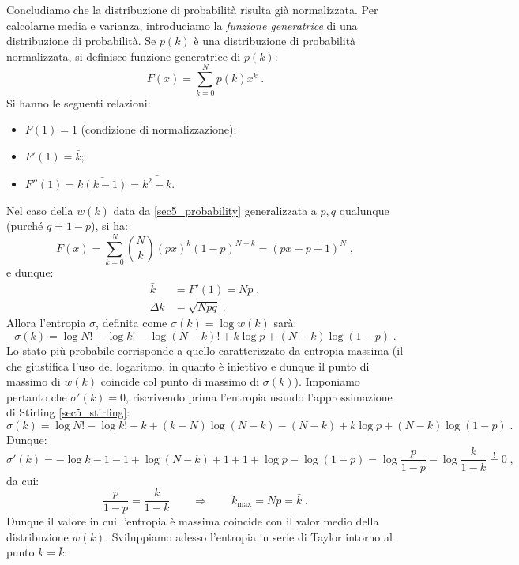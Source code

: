 Concludiamo che la distribuzione di probabilità risulta già normalizzata. Per calcolarne media e varianza, introduciamo la \textit{funzione generatrice} di una distribuzione di probabilità. Se $p(k)$ è una distribuzione di probabilità normalizzata, si definisce funzione generatrice di $p(k)$:
\begin{equation}
F(x)=\sum_{k=0}^N p(k)x^k\;.
\end{equation}
Si hanno le seguenti relazioni:
\begin{itemize}
 \item $F(1)=1$ (condizione di normalizzazione);
 \item $F'(1)=\bar{k}$;
 \item $F''(1)=\bar{k(k-1)}=\bar{k^2-k}$.
\end{itemize}
Nel caso della $w(k)$ data da \eqref{sec5_probability} generalizzata a $p,q$ qualunque (purché $q=1-p$), si ha:
\begin{equation}
F(x)=\sum_{k=0}^N \binom{N}{k}(px)^k(1-p)^{N-k}=(px-p+1)^N\;,
\end{equation}
e dunque:
\begin{align}
\bar{k}&=F'(1)=Np\;, \\
\Delta k &= \sqrt{Npq}\;.
\end{align}
Allora l'entropia $\sigma$, definita come $\sigma(k)=\log w(k)$ sarà:
\begin{equation}
\sigma(k)=\log N!-\log k! -\log(N-k)!+k\log p+(N-k)\log(1-p)\;.
\end{equation}
Lo stato più probabile corrisponde a quello caratterizzato da entropia massima (il che giustifica l'uso del 
logaritmo, in quanto è iniettivo e dunque il punto di massimo di $w(k)$ coincide col punto di massimo di $\sigma(k)$). Imponiamo pertanto che $\sigma'(k)=0$, riscrivendo prima l'entropia usando l'approssimazione di Stirling \eqref{sec5_stirling}:
\begin{equation}
\sigma(k)=\log N!-\log k!-k+(k-N)\log(N-k)-(N-k)+k\log p+(N-k)\log(1-p)\;.
\end{equation}
Dunque:
\begin{equation}
\sigma'(k)=-\log k-1-1+\log(N-k)+1+1+\log p-\log(1-p)=\log\frac{p}{1-p}-\log\frac{k}{1-k}\stackrel{!}{=}0\;,
\end{equation}
da cui:
\begin{equation}
\frac{p}{1-p}=\frac{k}{1-k}\qquad  \Longrightarrow\qquad k_{\mathrm{max}}=Np=\bar{k}\;.
\end{equation}
Dunque il valore in cui l'entropia è massima coincide con il valor medio della distribuzione $w(k)$. Sviluppiamo adesso l'entropia in serie di Taylor intorno al punto $k=\bar{k}$:
